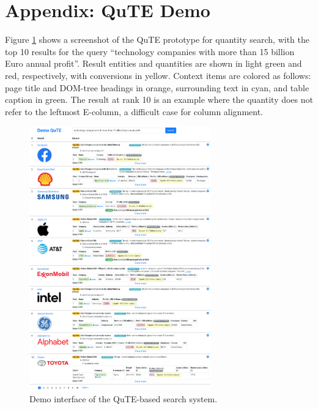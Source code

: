 \section*{Appendix: QuTE Demo}

Figure \ref{fig:demo} shows a screenshot of the QuTE prototype for quantity search, with the top 10 results for the query ``technology companies with more than 15 billion Euro annual profit''. Result entities and quantities are shown in light green and red, respectively, with conversions in yellow. Context items are colored as follows: page title and DOM-tree headings in orange, surrounding text in cyan, and table caption in green. 
The result at rank 10 is an example where the quantity does not refer to the leftmost E-column, a difficult case for column alignment.
\vspace{1.5em}
\begin{figure}[H]
\onecolumn
\centering
\includegraphics[width=0.7\textwidth]{figures/demo}
\caption{Demo interface of the QuTE-based search system.}
\label{fig:demo}
\end{figure}
\twocolumn

